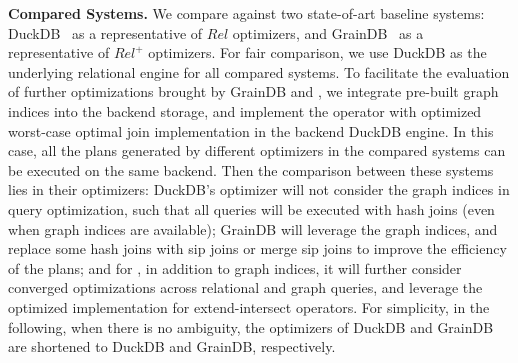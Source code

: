\noindent\textbf{Compared Systems. }
We compare \name against two state-of-art baseline systems: DuckDB~\cite{duckdb} as a representative of $Rel$ optimizers, and GrainDB~\cite{graindb} as a representative of $Rel^+$ optimizers.
For fair comparison, we use DuckDB as the underlying relational engine for all compared systems.
To facilitate the evaluation of further optimizations brought by GrainDB and \name, 
we integrate pre-built graph indices into the backend storage, and implement the \expandintersect operator with optimized worst-case optimal join implementation in the backend DuckDB engine.
In this case, all the plans generated by different optimizers in the compared systems can be executed on the same backend.
Then the comparison between these systems lies in their optimizers: DuckDB's optimizer will not consider the graph indices in query optimization, such that all queries will be executed with hash joins (even when graph indices are available);
GrainDB will leverage the graph indices, and replace some hash joins with sip joins or merge sip joins to improve the efficiency of the plans;
and for \name, in addition to graph indices, it will further consider converged optimizations across relational and graph queries, and leverage the optimized implementation for extend-intersect operators.
For simplicity, in the following, when there is no ambiguity, the optimizers of DuckDB and GrainDB are shortened to DuckDB and GrainDB, respectively.


